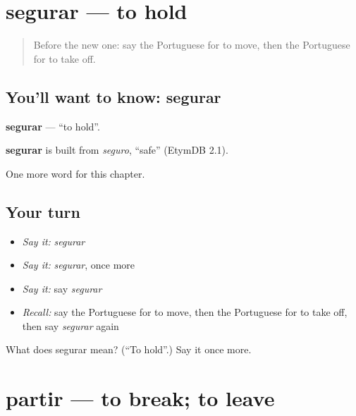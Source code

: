 \section[segurar]{segurar — to hold}

\label{lesson:PT-C172-segurar}



\begin{quote}
Before the new one: say the Portuguese for to move, then the Portuguese for to take off.
\end{quote}

\subsection*{You'll want to know: segurar}
\textbf{segurar} — \textquotedblleft{}to hold\textquotedblright{}.

\begin{cousinweb}
\textbf{segurar} is built from \emph{seguro}, \textquotedblleft{}safe\textquotedblright{} (EtymDB 2.1).
\end{cousinweb}

\begin{grammarlens}[title={What you've built}]
One more word for this chapter.
\end{grammarlens}

\subsection*{Your turn}
\begin{itemize}
\raggedright
  \item \emph{Say it:} \emph{segurar}
  \item \emph{Say it:} \emph{segurar}, once more
  \item \emph{Say it:} say \emph{segurar}
  \item \emph{Recall:} say the Portuguese for to move, then the Portuguese for to take off, then say \emph{segurar} again
\end{itemize}

\begin{tcolorbox}[breakable,colback=teal!4,colframe=teal!35!black,title={Before you move on}]
What does segurar mean? (\textquotedblleft{}To hold\textquotedblright{}.) Say it once more.
\end{tcolorbox}
\section[partir]{partir — to break; to leave}

